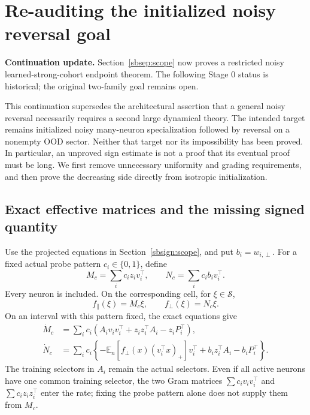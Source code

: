 \documentclass{article} %
\theoremstyle{plain}
\theoremstyle{definition}
\theoremstyle{remark}
\begin{document}
\section{Re-auditing the initialized noisy reversal goal}
\label{sbaudit:scope}
\textbf{Continuation update.} Section~\ref{sbsep:scope} now proves a restricted noisy learned-strong-cohort endpoint theorem. The following Stage 0 status is historical; the original two-family goal remains open.


This continuation supersedes the architectural assertion that a general noisy
reversal necessarily requires a second large dynamical theory. The intended
target remains initialized noisy many-neuron specialization followed by
reversal on a nonempty OOD sector. Neither that target nor its impossibility
has been proved. In particular, an unproved sign estimate is not a proof that
its eventual proof must be long. We first remove unnecessary uniformity and
grading requirements, and then prove the decreasing side directly from
isotropic initialization.

\subsection{Exact effective matrices and the missing signed quantity}

Use the projected equations in Section~\ref{sbsign:scope}, and put
$b_i=w_{i,\perp}$. For a fixed actual probe pattern $c_i\in\{0,1\}$,
define
\[
 M_c=\sum_i c_i z_iv_i^\top,\qquad
 N_c=\sum_i c_i b_iv_i^\top.
\]
Every neuron is included. On the corresponding cell, for $\xi\in\mathcal S$,
\begin{equation}\label{sbaudit:cell}
 f_\parallel(\xi)=M_c\xi,\qquad f_\perp(\xi)=N_c\xi.
\end{equation}
On an interval with this pattern fixed, the exact equations give
\begin{align}
 \dot M_c&=\sum_i c_i
 (A_iv_iv_i^\top+z_iz_i^\top A_i-z_iP_i^\top),
 \label{sbaudit:matrix-rate}\\
 \dot N_c&=\sum_i c_i
 \left\{-\mathbb E_n[f_\perp(x)(v_i^\top x)_+]v_i^\top
           +b_iz_i^\top A_i-b_iP_i^\top\right\}.
 \label{sbaudit:ambient-rate}
\end{align}
The training selectors in $A_i$ remain the actual selectors. Even if all
active neurons have one common training selector, the two Gram matrices
$\sum c_i v_iv_i^\top$ and $\sum c_i z_iz_i^\top$ enter the rate; fixing
the probe pattern alone does not supply them from $M_c$.
\end{document}
